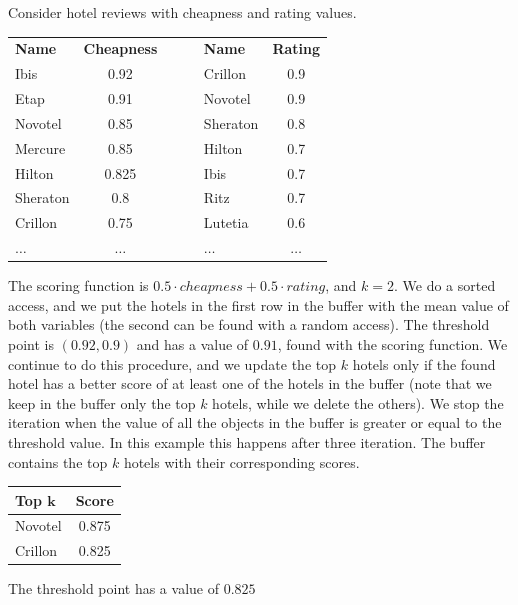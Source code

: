 \begin{example}
    Consider hotel reviews with cheapness and rating values.
    \begin{table}[H]
        \centering
        \begin{tabular}{|lc|c|lc|}
        \cline{1-2} \cline{4-5}
        \textbf{Name} & \textbf{Cheapness} & $\:\:\:\:\:\:$ & \textbf{Name} & \textbf{Rating} \\ \cline{1-2} \cline{4-5} 
        Ibis          & 0.92               &                & Crillon       & 0.9             \\ 
        Etap          & 0.91               &                & Novotel       & 0.9             \\ 
        Novotel       & 0.85               &                & Sheraton      & 0.8             \\ 
        Mercure       & 0.85               &                & Hilton        & 0.7             \\ 
        Hilton        & 0.825              &                & Ibis          & 0.7             \\ 
        Sheraton      & 0.8                &                & Ritz          & 0.7             \\ 
        Crillon       & 0.75               &                & Lutetia       & 0.6             \\ 
        $\dots$       & $\dots$            &                & $\dots$       & $\dots$         \\ \cline{1-2} \cline{4-5} 
        \end{tabular}
    \end{table}
    The scoring function is $0.5 \cdot cheapness+0.5 \cdot rating$, and $k=2$. 
    We do a sorted access, and we put the hotels in the first row in the buffer with the mean value of both variables (the second can be found with a random access). 
    The threshold point is $(0.92,0.9)$ and has a value of $0.91$, found with the scoring function. 
    We continue to do this procedure, and we update the top $k$ hotels only if the found hotel has a better score of at least one of the hotels in the buffer (note that we keep in the buffer only the top $k$ hotels, while we delete the others). 
    We stop the iteration when the value of all the objects in the buffer is greater or equal to the threshold value. 
    In this example this happens after three iteration. 
    The buffer contains the top $k$ hotels with their corresponding scores.
    \begin{table}[H]
        \centering
        \begin{tabular}{|lc|}
        \hline
        \textbf{Top $\boldsymbol{k}$} & \textbf{Score} \\ \hline
        Novotel                       & 0.875          \\ 
        Crillon                       & 0.825          \\ \hline
        \end{tabular}
    \end{table}
    The threshold point has a value of $0.825$
\end{example}
